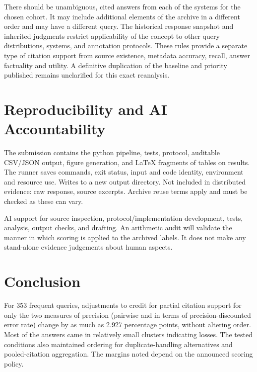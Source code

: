 \documentclass[acmsmall,screen,nonacm]{acmart}
\begin{document}
There should be unambiguous, cited answers from each of the systems for the chosen cohort. It may include additional elements of the archive in a different order and may have a different query. The historical response snapshot and inherited judgments restrict applicability of the concept to other query distributions, systems, and annotation protocols. These rules provide a separate type of citation support from source existence, metadata accuracy, recall, answer factuality and utility. A definitive duplication of the baseline and priority published remains unclarified for this exact reanalysis.

\section{Reproducibility and AI Accountability}
The submission contains the python pipeline, tests, protocol, auditable CSV/JSON output, figure generation, and LaTeX fragments of tables on results. The runner saves commands, exit status, input and code identity, environment and resource use. Writes to a new output directory. Not included in distributed evidence: raw response, source excerpts. Archive reuse terms apply and must be checked as these can vary.

AI support for source inspection, protocol/implementation development, tests, analysis, output checks, and drafting. An arithmetic audit will validate the manner in which scoring is applied to the archived labels. It does not make any stand-alone evidence judgements about human aspects.

\section{Conclusion}
For 353 frequent queries, adjustments to credit for partial citation support for only the two measures of precision (pairwise and in terms of precision-discounted error rate) change by as much as 2.927 percentage points, without altering order. Most of the answers came in relatively small clusters indicating losses. The tested conditions also maintained ordering for duplicate-handling alternatives and pooled-citation aggregation. The margins noted depend on the announced scoring policy.
\clearpage


\end{document}

